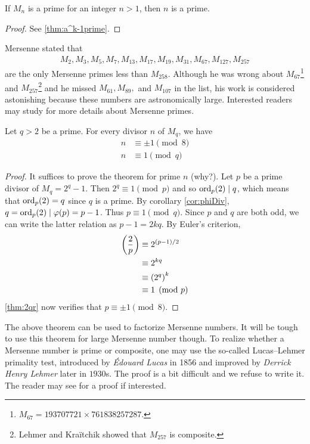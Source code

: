 	\begin{proposition}
		If $M_n$ is a prime for an integer $n>1$, then $n$ is a prime.
	\end{proposition}

	\begin{proof}
		See \autoref{thm:a^k-1prime}.
	\end{proof}

Mersenne stated that
	\begin{align*}
			M_{2}, M_{3}, M_{5}, M_{7}, M_{13},M_{17},M_{19},M_{31},M_{67},M_{127},M_{257}
	\end{align*}
are the only Mersenne primes less than $M_{258}$. Although he was wrong about $M_{67}$\footnote{$M_{67}=193707721 \times 761838257287.$} and $M_{257}$\footnote{Lehmer and Kra\"{i}tchik showed that $M_{257}$ is composite.} and he missed $M_{61}, M_{89},$ and $M_{107}$ in the list, his work is considered astonishing because these numbers are astronomically large. Interested readers may study \textcite{ribenboim_1991} for more details about Mersenne primes.

	\begin{theorem}
			Let $q>2$ be a prime. For every divisor $n$ of $M_q$, we have
				\begin{align*}
					n &\equiv \pm 1 \pmod 8\\
					n &\equiv 1 \pmod q
				\end{align*}
	\end{theorem}

	\begin{proof}
		It suffices to prove the theorem for prime $n$ (why?). Let $p$ be a prime divisor of $M_q=2^q-1$. Then $2^q \equiv 1 \pmod p$ and so $\operatorname{ord}_p(2)\mid q$, which means that $\operatorname{ord}_p(2)=q$ since $q$ is a prime. By corollary \eqref{cor:phiDiv}, $q=\operatorname{ord}_p(2)\mid \varphi(p)=p-1$. Thus $p \equiv 1 \pmod q$. Since $p$ and $q$ are both odd, we can write the latter relation as $p-1=2kq$. By Euler's criterion,
			\begin{align*}
				\left(\dfrac{2}{p}\right) &\equiv 2^{(p-1)/2} \\
								  &\equiv 2^{kq}\\
								  &\equiv \left(2^q\right)^k\\
								  &\equiv 1 \pmod p
			\end{align*}
		\autoref{thm:2qr} now verifies that $p \equiv \pm 1 \pmod 8$.
	\end{proof}

The above theorem can be used to factorize Mersenne numbers. It will be tough to use this theorem for large Mersenne number though. To realize whether a Mersenne number is prime or composite, one may use the so-called Lucas–Lehmer primality test, introduced by \textit{\'Edouard Lucas} in 1856 and improved by \textit{Derrick Henry Lehmer} later in $1930$s. The proof is a bit difficult and we refuse to write it. The reader may see \textcite{bruce_1993} for a proof if interested.

